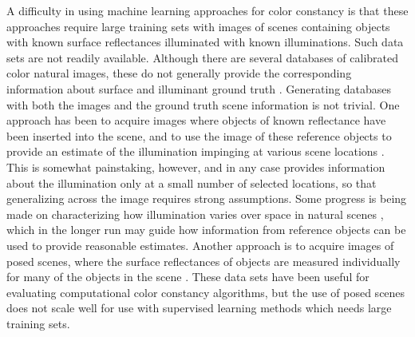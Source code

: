\documentclass{jov}
\begin{document}
A difficulty in using machine learning approaches for color constancy is that these approaches require large training sets with images of scenes containing objects with known surface reflectances illuminated with known illuminations.  Such data sets are not readily available. Although there are several databases of calibrated color natural images, these do not generally provide the corresponding information about surface and illuminant ground truth \cite{ChakrabartiHyperspectral,NascimentoFoster2016,ParragaHyperspectralData,TkacikUpennHypersepctralData,skauli2013collection,olmos2004biologically}. 
Generating databases with both the images and the ground truth scene information is not trivial. One approach has been to acquire images where objects of known reflectance have been inserted into the scene, and to use the image of these reference objects to provide an estimate of the illumination impinging at various scene locations \cite{NascimentoFoster2016}.  This is somewhat painstaking, however, and in any case provides information about the illumination only at a small number of selected locations, so that generalizing across the image requires strong assumptions. Some progress is being made on characterizing how illumination varies over space in natural scenes \cite{mury2007spatial}, which in the longer run may guide how information from reference objects can be used to provide reasonable estimates.  Another approach is to acquire images of posed scenes, where the surface reflectances of objects are measured individually for many of the objects in the scene \cite{funt1988color,ciurea2003large, davidPennHyperspectral}. 
These data sets have been useful for evaluating computational color constancy algorithms, but the use of posed scenes does not scale well for use with supervised learning methods which needs large training sets. 
 
\end{document}
